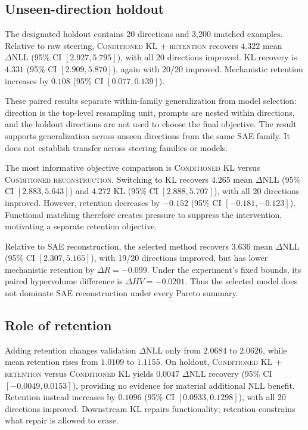 \documentclass[11pt,twocolumn]{article}
\newcommand{\dNLL}{\Delta\mathrm{NLL}}
\newcommand{\method}[1]{\textsc{#1}}
\begin{document}
\subsection{Unseen-direction holdout}
The designated holdout contains 20 directions and 3,200 matched examples. Relative to raw steering, \method{Conditioned KL + retention} recovers $4.322$ mean $\dNLL$ (95\% CI $[2.927,5.795]$), with all 20 directions improved. KL recovery is $4.331$ (95\% CI $[2.909,5.870]$), again with 20/20 improved. Mechanistic retention increases by $0.108$ (95\% CI $[0.077,0.139]$).

These paired results separate within-family generalization from model selection: direction is the top-level resampling unit, prompts are nested within directions, and the holdout directions are not used to choose the final objective. The result supports generalization across unseen directions from the same SAE family. It does not establish transfer across steering families or models.

The most informative objective comparison is \method{Conditioned KL} versus \method{Conditioned reconstruction}. Switching to KL recovers $4.265$ mean $\dNLL$ (95\% CI $[2.883,5.643]$) and $4.272$ KL (95\% CI $[2.888,5.707]$), with all 20 directions improved. However, retention decreases by $-0.152$ (95\% CI $[-0.181,-0.123]$). Functional matching therefore creates pressure to suppress the intervention, motivating a separate retention objective.

Relative to SAE reconstruction, the selected method recovers $3.636$ mean $\dNLL$ (95\% CI $[2.307,5.165]$), with 19/20 directions improved, but has lower mechanistic retention by $\Delta R=-0.099$. Under the experiment's fixed bounds, its paired hypervolume difference is $\Delta HV=-0.0201$. Thus the selected model does not dominate SAE reconstruction under every Pareto summary.

\subsection{Role of retention}
Adding retention changes validation $\dNLL$ only from $2.0684$ to $2.0626$, while mean retention rises from $1.0109$ to $1.1155$. On holdout, \method{Conditioned KL + retention} versus \method{Conditioned KL} yields $0.0047$ $\dNLL$ recovery (95\% CI $[-0.0049,0.0153]$), providing no evidence for material additional NLL benefit. Retention instead increases by $0.1096$ (95\% CI $[0.0933,0.1298]$), with all 20 directions improved. Downstream KL repairs functionality; retention constrains what repair is allowed to erase.
\end{document}
